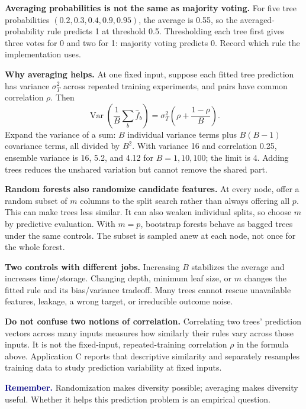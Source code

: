 \documentclass[11pt,a4paper]{article}
\newcommand{\idea}[1]{\textcolor{navy}{\textbf{Remember.}} #1}
\begin{document}
\textbf{Averaging probabilities is not the same as majority voting.}
For five tree probabilities $(0.2,0.3,0.4,0.9,0.95)$, the average is 0.55,
so the averaged-probability rule predicts 1 at threshold 0.5. Thresholding each
tree first gives three votes for 0 and two for 1: majority voting predicts 0.
Record which rule the implementation uses.

\textbf{Why averaging helps.} At one fixed input, suppose each fitted tree
prediction has variance $\sigma_T^2$ across repeated training experiments,
and pairs have common correlation $\rho$. Then
\[
\boxed{\operatorname{Var}\!\left(\frac1B\sum_b\widehat f_b\right)
=\sigma_T^2\left(\rho+\frac{1-\rho}{B}\right).}
\]
Expand the variance of a sum: $B$ individual variance terms plus $B(B-1)$
covariance terms, all divided by $B^2$. With variance 16 and correlation 0.25,
ensemble variance is 16, 5.2, and 4.12 for $B=1,10,100$; the limit is 4.
Adding trees reduces the unshared variation but cannot remove the shared part.

\textbf{Random forests also randomize candidate features.}
At every node, offer a random subset of $m$ columns to the split search rather
than always offering all $p$. This can make trees less similar. It can also
weaken individual splits, so choose $m$ by predictive evaluation.
With $m=p$, bootstrap forests behave as bagged trees under the same controls.
The subset is sampled anew at each node, not once for the whole forest.

\textbf{Two controls with different jobs.}
Increasing $B$ stabilizes the average and increases time/storage. Changing
depth, minimum leaf size, or $m$ changes the fitted rule and its bias/variance
tradeoff. Many trees cannot rescue unavailable features, leakage, a wrong target,
or irreducible outcome noise.

\textbf{Do not confuse two notions of correlation.}
Correlating two trees' prediction vectors across many inputs measures how
similarly their rules vary across those inputs. It is not the fixed-input,
repeated-training correlation $\rho$ in the formula above. Application C reports
that descriptive similarity and separately resamples training data to study
prediction variability at fixed inputs.

\idea{Randomization makes diversity possible; averaging makes diversity useful.
Whether it helps this prediction problem is an empirical question.}

\newpage
\end{document}
